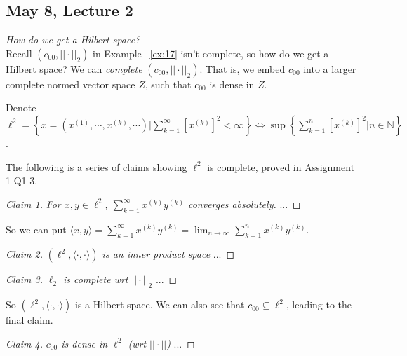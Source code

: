 \documentclass[11pt]{amsart}
\theoremstyle{definition}
\numberwithin{equation}{section}
\newcommand{\bN}{ \mathbb{N} }	%
\begin{document}
\vspace{6pt}

\subsection{May 8, Lecture 2}
\textit{How do we get a Hilbert space?} \\ 

Recall $ \left(c_{00}, ||\cdot ||_2\right) $ in Example ~\ref{ex:17} isn't complete, so how do we get a Hilbert space? We can \textit{complete} $ \left(c_{00}, ||\cdot ||_2\right) $. That is, we embed $c_{00}$ into a larger complete normed vector space $Z$, such that $c_{00}$ is dense in $Z$. 

\vspace{6pt}

Denote  $\ell^2 = \left\{ x = \left(x^{(1)}, \cdots, x^{(k)}, \cdots \right) |  \sum_{k = 1}^{\infty}\left[x^{(k)}\right]^2 < \infty \right\} \Leftrightarrow \sup \left\{  \sum_{k = 1}^{n}\left[x^{(k)}\right]^2 | n \in \bN \right\}$. 

\vspace{6pt}

The following is a series of claims showing $\ell^2$ is complete, proved in Assignment 1 Q1-3. %

\begin{proof}[Claim 1] \textit{For $x,y \in \ell^2$, $\sum_{k=1}^{\infty} x^{(k)} y^{(k)}$ converges absolutely.}
...
\end{proof}

So we can put $\langle x,y \rangle = \sum_{k=1}^{\infty} x^{(k)} y^{(k)} = \lim_{n \rightarrow \infty} \sum_{k=1}^{n} x^{(k)} y^{(k)}$. 

\begin{proof}[Claim 2] \textit{$\left(\ell^2, \langle \cdot, \cdot \rangle \right)$ is an inner product space}
...
\end{proof}

\begin{proof}[Claim 3] \textit{$\ell_2$ is complete wrt $||\cdot ||_2$}
...
\end{proof}

So $\left( \ell^2 , \langle \cdot, \cdot \rangle \right)$ is a Hilbert space. We can also see that $c_{00} \subseteq \ell^2$, leading to the final claim. 

\begin{proof}[Claim 4] \textit{$c_{00}$ is dense in $\ell^2$ (wrt $||\cdot ||$)}
...
\end{proof}
\end{document}
